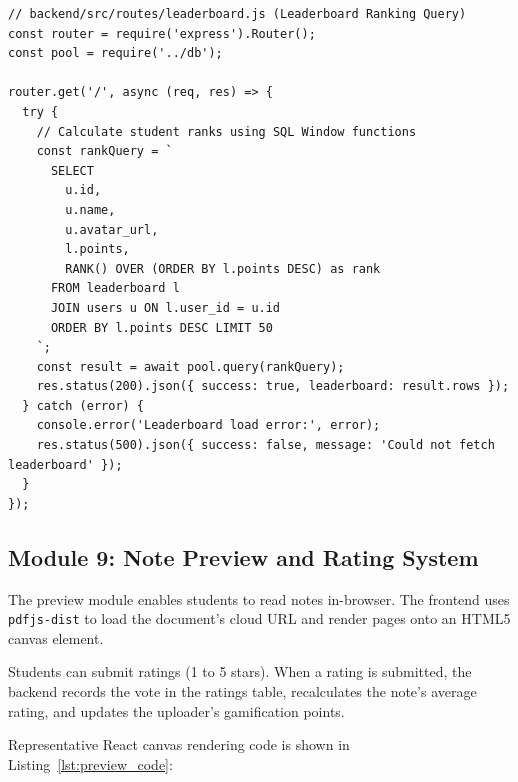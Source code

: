 \documentclass[12,Times new Roman,a4paper]{report}
\begin{document}
\begin{verbatim}
// backend/src/routes/leaderboard.js (Leaderboard Ranking Query)
const router = require('express').Router();
const pool = require('../db');

router.get('/', async (req, res) => {
  try {
    // Calculate student ranks using SQL Window functions
    const rankQuery = `
      SELECT 
        u.id, 
        u.name, 
        u.avatar_url, 
        l.points,
        RANK() OVER (ORDER BY l.points DESC) as rank
      FROM leaderboard l
      JOIN users u ON l.user_id = u.id
      ORDER BY l.points DESC LIMIT 50
    `;
    const result = await pool.query(rankQuery);
    res.status(200).json({ success: true, leaderboard: result.rows });
  } catch (error) {
    console.error('Leaderboard load error:', error);
    res.status(500).json({ success: false, message: 'Could not fetch leaderboard' });
  }
});
\end{verbatim}
\label{lst:leaderboard_code}

\subsection{Module 9: Note Preview and Rating System}

The preview module enables students to read notes in-browser. The frontend uses \texttt{pdfjs-dist} to load the document's cloud URL and render pages onto an HTML5 canvas element. 

Students can submit ratings (1 to 5 stars). When a rating is submitted, the backend records the vote in the ratings table, recalculates the note's average rating, and updates the uploader's gamification points.

Representative React canvas rendering code is shown in Listing~\ref{lst:preview_code}:
\end{document}
